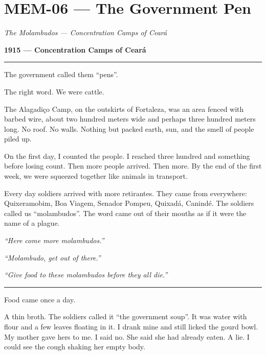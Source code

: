 \section*{\textbf{MEM-06} --- The Government Pen}

\noindent \textit{The Molambudos --- Concentration Camps of Ceará}

\noindent \textbf{1915 --- Concentration Camps of Ceará}

\vspace{0.5em}\noindent\rule{\textwidth}{0.5pt}\vspace{0.5em}

\noindent The government called them \textquotedblleft{}pens\textquotedblright{}.

\noindent The right word. We were cattle.

\noindent The Alagadiço Camp, on the outskirts of Fortaleza, was an area fenced with barbed wire, about two hundred meters wide and perhaps three hundred meters long. No roof. No walls. Nothing but packed earth, sun, and the smell of people piled up.

\noindent On the first day, I counted the people. I reached three hundred and something before losing count. Then more people arrived. Then more. By the end of the first week, we were squeezed together like animals in transport.

\noindent Every day soldiers arrived with more retirantes. They came from everywhere: Quixeramobim, Boa Viagem, Senador Pompeu, Quixadá, Canindé. The soldiers called us \textquotedblleft{}molambudos\textquotedblright{}. The word came out of their mouths as if it were the name of a plague.

\noindent \textit{\textquotedblleft{}Here come more molambudos.\textquotedblright{}}

\noindent \textit{\textquotedblleft{}Molambudo, get out of there.\textquotedblright{}}

\noindent \textit{\textquotedblleft{}Give food to these molambudos before they all die.\textquotedblright{}}

\vspace{0.5em}\noindent\rule{\textwidth}{0.5pt}\vspace{0.5em}

\noindent Food came once a day.

\noindent A thin broth. The soldiers called it \textquotedblleft{}the government soup\textquotedblright{}. It was water with flour and a few leaves floating in it. I drank mine and still licked the gourd bowl. My mother gave hers to me. I said no. She said she had already eaten. A lie. I could see the cough shaking her empty body.

